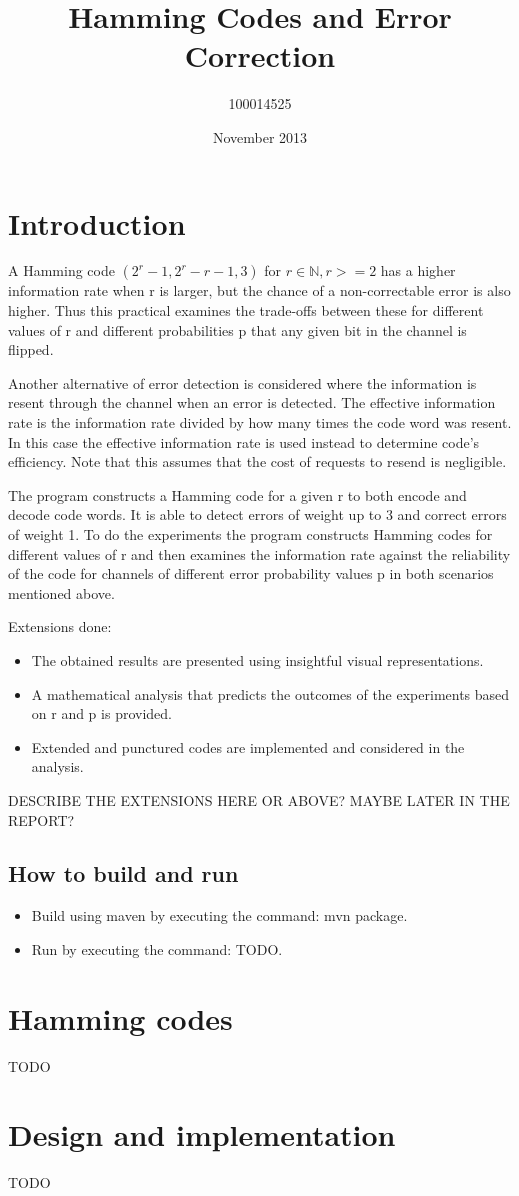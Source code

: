 \documentclass{article}
\title{Hamming Codes and Error Correction}
\author{100014525}
\date{November 2013}
\begin{document}
\maketitle

\section{Introduction}

A Hamming code $(2^r - 1, 2^r - r - 1, 3)$ for $r \in \mathbb{N}, r >= 2$ has a higher information rate when r is larger, but the chance of a non-correctable error is also higher. Thus this practical examines the trade-offs between these for different values of r and different probabilities p that any given bit in the channel is flipped.

Another alternative of error detection is considered where the information is resent through the channel when an error is detected. The effective information rate is the information rate divided by how many times the code word was resent. In this case the effective information rate is used instead to determine code's efficiency. Note that this assumes that the cost of requests to resend is negligible.

The program constructs a Hamming code for a given r to both encode and decode code words. It is able to detect errors of weight up to 3 and correct errors of weight 1. To do the experiments the program constructs Hamming codes for different values of r and then examines the information rate against the reliability of the code for channels of different error probability values p in both scenarios mentioned above.

Extensions done:
\begin{itemize}
	\item The obtained results are presented using insightful visual representations.
	\item A mathematical analysis that predicts the outcomes of the experiments based on r and p is provided.
	\item Extended and punctured codes are implemented and considered in the analysis.
\end{itemize}

DESCRIBE THE EXTENSIONS HERE OR ABOVE? MAYBE LATER IN THE REPORT?

\subsection{How to build and run}
\begin{itemize}
	\item Build using maven by executing the command: mvn package.
	\item Run by executing the command: TODO.
\end{itemize}

\section{Hamming codes}

TODO


\section{Design and implementation}

TODO
\end{document}
